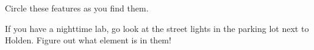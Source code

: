 \documentclass[11pt]{article}
\begin{document}
Circle these features as you find them.

If you have a nighttime lab, go look at the street lights in the parking lot next to Holden. Figure out what element is in them!


\begin{center}
	
	\begin{landscape}
				
	\end{landscape}
	
\end{center}
\newpage
\end{document}
